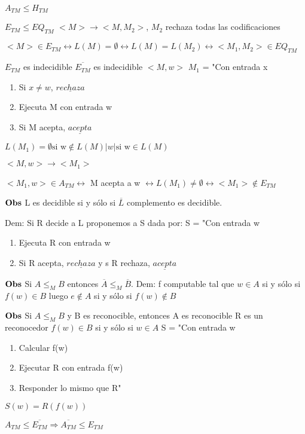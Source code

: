 \documentclass{homework}
\begin{document}
$A_{TM} \leq H_{TM}$

$E_{TM} \leq EQ_{TM}$
$<M> \rightarrow <M,M_2>$, $M_2$ rechaza todas las codificaciones

$<M> \in E_{TM} \leftrightarrow L(M) = \emptyset \leftrightarrow L(M) = L(M_2) \leftrightarrow <M_1,M_2> \in EQ_{TM}$

$E_{TM}$ es indecidible 
$\overline{E_{TM}}$ es indecidible 
$<M, w>$
$M_1$ = "Con entrada x
\begin{enumerate}
	\item Si $x \neq w$, $\underline{rechaza}$
	\item Ejecuta M con entrada w
	\item Si M acepta, $\underline{acepta}$
\end{enumerate}

$L(M_1) = \emptyset \text{si w} \notin L(M) |w| \text{si w} \in L(M)$

$<M, w> \rightarrow <M_1>$

$<M_1,w> \in A_{TM} \leftrightarrow$ M acepta a w $\leftrightarrow L(M_1) \neq \emptyset \leftrightarrow <M_1> \notin E_{TM}$ 

$\bf{Obs}$ L es decidible si y sólo si $\overline{L}$ complemento es decidible.

Dem: Si R decide a L proponemos a S dada por:
S = "Con entrada w
\begin{enumerate}
	\item Ejecuta R con entrada w
	\item Si R acepta, $\underline{rechaza}$ y s R rechaza, $\underline{acepta}$
\end{enumerate}

$\bf{Obs}$ Si $A \leq_{M} B$ entonces $ \overline{A}\leq_{M} \overline{B}$.
Dem: f computable tal que $w \in A$ si y sólo si $f(w) \in B$ luego $e \notin A$ si y sólo si $f(w) \notin B$

$\bf{Obs}$ Si $A \leq_{M} B$ y B es reconocible, entonces A es reconocible
R es un reconocedor $f(w) \in B$ si y sólo si $w \in A$
S = "Con entrada w
\begin{enumerate}
	\item Calcular f(w)
	\item Ejecutar R con entrada f(w)
	\item Responder lo mismo que R"
\end{enumerate}

$S(w) = R(f(w))$


$A_{TM} \leq \overline{E_{TM}} \Rightarrow \overline{A_{TM}} \leq E_{TM}$
\end{document}
